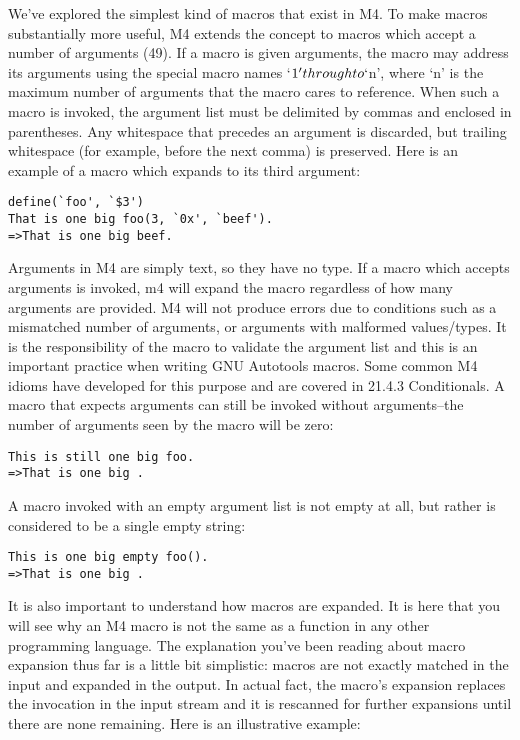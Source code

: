 We've explored the simplest kind of macros that exist in M4. To make macros substantially more useful, M4 extends the concept to macros which accept a number of arguments (49). If a macro is given arguments, the macro may address its arguments using the special macro names `$1' through to `$n', where `n' is the maximum number of arguments that the macro cares to reference. When such a macro is invoked, the argument list must be delimited by commas and enclosed in parentheses. Any whitespace that precedes an argument is discarded, but trailing whitespace (for example, before the next comma) is preserved. Here is an example of a macro which expands to its third argument:

 	
\begin{verbatim}
define(`foo', `$3')
That is one big foo(3, `0x', `beef').
=>That is one big beef.
\end{verbatim}

Arguments in M4 are simply text, so they have no type. If a macro which accepts arguments is invoked, m4 will expand the macro regardless of how many arguments are provided. M4 will not produce errors due to conditions such as a mismatched number of arguments, or arguments with malformed values/types. It is the responsibility of the macro to validate the argument list and this is an important practice when writing GNU Autotools macros. Some common M4 idioms have developed for this purpose and are covered in 21.4.3 Conditionals. A macro that expects arguments can still be invoked without arguments--the number of arguments seen by the macro will be zero:

 	

\begin{verbatim}
This is still one big foo.
=>That is one big .
\end{verbatim}

A macro invoked with an empty argument list is not empty at all, but rather is considered to be a single empty string:

 	

\begin{verbatim}
This is one big empty foo().
=>That is one big .
\end{verbatim}

It is also important to understand how macros are expanded. It is here that you will see why an M4 macro is not the same as a function in any other programming language. The explanation you've been reading about macro expansion thus far is a little bit simplistic: macros are not exactly matched in the input and expanded in the output. In actual fact, the macro's expansion replaces the invocation in the input stream and it is rescanned for further expansions until there are none remaining. Here is an illustrative example:

